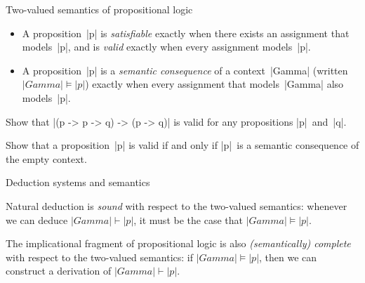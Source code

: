\documentclass[t,compress,hyperref={hidelinks}]{beamer}
\begin{document}
\begin{frame}{Two-valued semantics of propositional logic}

\begin{itemize}

\item A proposition~|p| is \emph{satisfiable} exactly when there exists an assignment that models~|p|, and is \emph{valid} exactly when every assignment models~|p|.

\item A proposition~|p| is a \emph{semantic consequence} of a context~|Gamma| (written $|Gamma| \models |p|$) exactly when every assignment that models~|Gamma| also models~|p|.

\end{itemize}

 Show that |(p -> p -> q) -> (p -> q)| is valid for any propositions |p|~and~|q|.

 Show that a proposition~|p| is valid if and only if |p|~is a semantic consequence of the empty context.

\end{frame}

\begin{frame}{Deduction systems and semantics}

Natural deduction is \emph{sound} with respect to the two-valued semantics: whenever we can deduce $|Gamma| \vdash |p|$, it must be the case that $|Gamma| \models |p|$.

The implicational fragment of propositional logic is also \emph{(semantically) complete} with respect to the two-valued semantics: if $|Gamma| \models |p|$, then we can construct a derivation of $|Gamma| \vdash |p|$.

\end{frame}
\end{document}
